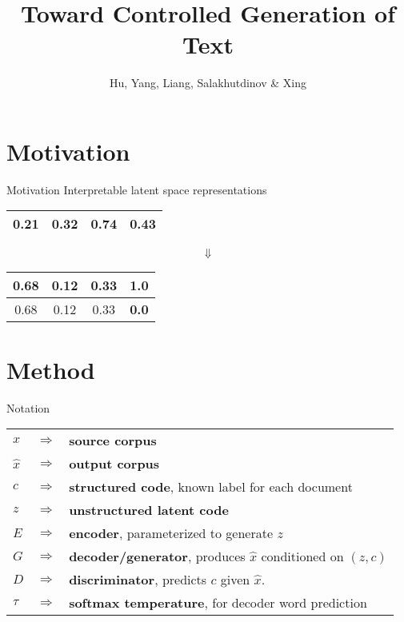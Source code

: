 \documentclass{beamer}
\title{Toward Controlled Generation of Text}
\date{}
\author{Hu, Yang, Liang, Salakhutdinov \& Xing}
\institute{ICML 2017}
\begin{document}
\maketitle

\section{Motivation}
\begin{frame}{Motivation}
  Interpretable latent space representations
  \begin{center}
    \begin{tabular}{ | c | c | c | c | }
      \hline
      0.21 & 0.32 & 0.74 & 0.43 \\
      \hline
    \end{tabular}
    {\Huge$$\Downarrow$$}
    \begin{tabular}{ | c | c | c | c | }
      \hline
      0.68 & 0.12 & 0.33 & {\color{red}\textbf{1.0}} \\
      \hline
      \hline
      0.68 & 0.12 & 0.33 & {\color{red}\textbf{0.0}} \\
      \hline
    \end{tabular}
  \end{center}
\end{frame}

\section{Method}
\begin{frame}{Notation}
  \large
  \begin{tabular}{ l c l }
    $x$ & $\Rightarrow$ & \textbf{source corpus} \\
    $\hat{x}$ & $\Rightarrow$ & \textbf{output corpus} \\
    $c$ & $\Rightarrow$ & \textbf{structured code}, known label for each document \\
    $z$ & $\Rightarrow$ & \textbf{unstructured latent code} \\
    $E$ & $\Rightarrow$ & \textbf{encoder}, parameterized to generate $z$  \\
    $G$ & $\Rightarrow$ & \textbf{decoder/generator}, produces $\hat{x}$ conditioned on $(z, c)$ \\
    $D$ & $\Rightarrow$ & \textbf{discriminator}, predicts $c$ given $\hat{x}$. \\
    $\tau$ & $\Rightarrow$ & \textbf{softmax temperature}, for decoder word prediction \\
  \end{tabular}
\end{frame}
\end{document}
